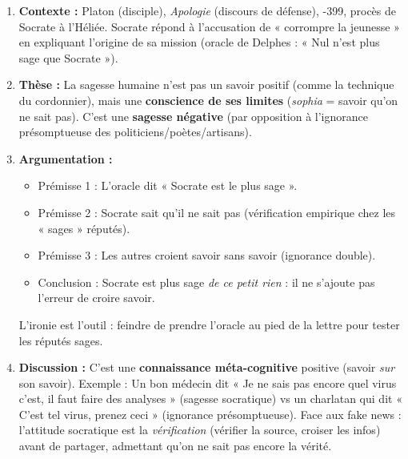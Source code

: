 \documentclass[11pt]{article}
\begin{document}
\begin{corrige}
\begin{enumerate}
    \item \textbf{Contexte :} Platon (disciple), \emph{Apologie} (discours de défense), -399, procès de Socrate à l'Héliée. Socrate répond à l'accusation de « corrompre la jeunesse » en expliquant l'origine de sa mission (oracle de Delphes : « Nul n'est plus sage que Socrate »).
    \item \textbf{Thèse :} La sagesse humaine n'est pas un savoir positif (comme la technique du cordonnier), mais une \textbf{conscience de ses limites} (\emph{sophia} = savoir qu'on ne sait pas). C'est une \textbf{sagesse négative} (par opposition à l'ignorance présomptueuse des politiciens/poètes/artisans).
    \item \textbf{Argumentation :}
    \begin{itemize}
        \item Prémisse 1 : L'oracle dit « Socrate est le plus sage ».
        \item Prémisse 2 : Socrate sait qu'il ne sait pas (vérification empirique chez les « sages » réputés).
        \item Prémisse 3 : Les autres croient savoir sans savoir (ignorance double).
        \item Conclusion : Socrate est plus sage \emph{de ce petit rien} : il ne s'ajoute pas l'erreur de croire savoir.
    \end{itemize}
    L'ironie est l'outil : feindre de prendre l'oracle au pied de la lettre pour tester les réputés sages.
    \item \textbf{Discussion :} C'est une \textbf{connaissance méta-cognitive} positive (savoir \emph{sur} son savoir). Exemple : Un bon médecin dit « Je ne sais pas encore quel virus c'est, il faut faire des analyses » (sagesse socratique) vs un charlatan qui dit « C'est tel virus, prenez ceci » (ignorance présomptueuse). Face aux fake news : l'attitude socratique est la \emph{vérification} (vérifier la source, croiser les infos) avant de partager, admettant qu'on ne sait pas encore la vérité.
\end{enumerate}
\end{corrige}
\end{document}
